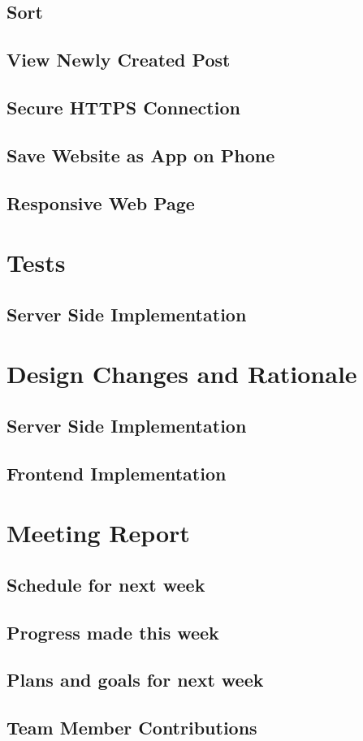 \documentclass[12pt]{article}
\begin{document}
      \subsection{Sort}
      
      \subsection{View Newly Created Post}
     
      \subsection{Secure HTTPS Connection}
      
      \subsection{Save Website as App on Phone}
      
      \subsection{Responsive Web Page}
      
\section{Tests}
\subsection{Server Side Implementation}

\section{Design Changes and Rationale}
\subsection{Server Side Implementation}

\subsection{Frontend Implementation}

\section{Meeting Report}
\subsection{Schedule for next week}

\subsection{Progress made this week}

\subsection{Plans and goals for next week}
\subsection{Team Member Contributions}
\end{document}
